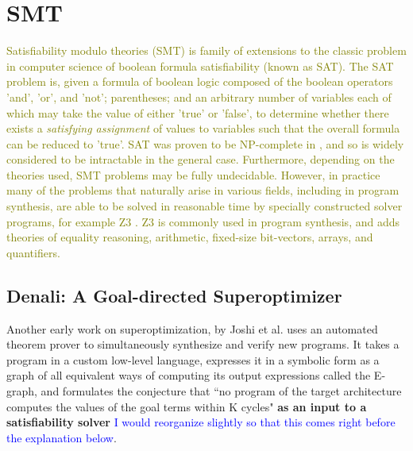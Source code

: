 \documentclass[12pt,twoside]{reedthesis}
\newcommand{\green}[1]{\textcolor{olive}{#1}}
\newcommand{\comment}[2]{\textbf{#1} \textcolor{blue}{#2}}
\newcommand{\addressed}[2]{{#1}}
\begin{document}
    \section{SMT}
        \green{
        Satisfiability modulo theories (SMT) is family of extensions to the classic problem in computer science of boolean formula satisfiability (known as SAT).
        The SAT problem is, given a formula of boolean logic composed of 
                the boolean operators 'and', 'or', and 'not';
                parentheses;
                and an arbitrary number of variables each of which may take the value of either 'true' or 'false',
            to determine whether there exists a \textit{satisfying assignment} of values to variables such that the overall formula can be reduced to 'true'.
        SAT was proven to be NP-complete in \cite{cook1971sat}, and so is widely considered to be intractable in the general case.
        Furthermore, depending on the theories used, SMT problems may be fully undecidable.
        However, in practice many of the problems that naturally arise in various fields, including in program synthesis, are able to be solved in reasonable time by specially constructed solver programs, for example Z3 \cite{demoura2008z3}.
        Z3 is commonly used in program synthesis, and adds theories of equality reasoning, arithmetic, fixed-size bit-vectors, arrays, and quantifiers.
        }

        \subsection{Denali: A Goal-directed Superoptimizer}
            Another early work on superoptimization, by Joshi et al. \cite{joshi2002denali} uses an automated theorem prover to simultaneously synthesize and verify new programs.
            It takes a program in a custom low-level language, expresses it in a symbolic form as a graph of all equivalent ways of computing its output expressions
                \addressed{called the E-graph}{I would be inclined to have a separate description of E-graphs, but it depends on the structure of the section},
                and formulates the conjecture that ``no program of the target architecture computes the values of the goal terms within K cycles"
                    \comment{as an input to a satisfiability solver}{I would reorganize slightly so that this comes right before the explanation below}. 
                
\end{document}
